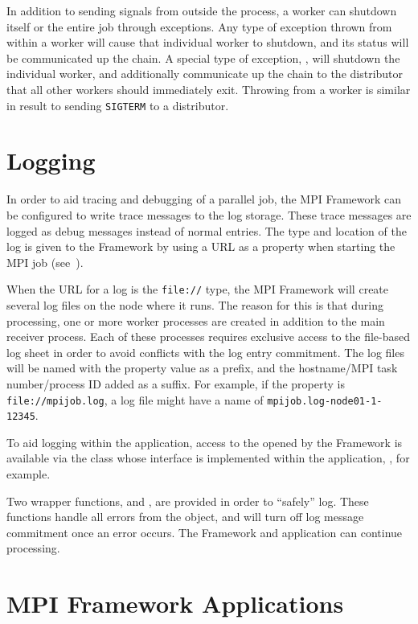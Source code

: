 In addition to sending signals from outside the process, a worker can shutdown
itself or the entire job through exceptions. Any type of exception thrown
from within a worker will cause that individual worker to shutdown, and its
status will be communicated up the chain. A special type of exception,
, will shutdown the individual worker, and additionally
communicate up the chain to the distributor that all other workers should
immediately exit. Throwing  from a worker is similar in
result to sending \texttt{SIGTERM} to a distributor.

\section{Logging}
\label{sec-mpilogging}
In order to aid tracing and debugging of a parallel job, the MPI Framework
can be configured to write trace messages to the log storage. These trace
messages are logged as debug messages instead of normal entries.
The type and location of the log is given to the 
Framework by using a URL as a property when starting the MPI
job (see~).

When the URL for a log is the {\tt file://} type, the MPI Framework will create
several log files on the node where it runs. The reason for this is that during
 processing, one or more worker processes are created in
addition to the main receiver process. Each of these processes requires
exclusive access to the file-based log sheet in order to avoid conflicts with
the log entry commitment.
The log files will be named with the property value
as a prefix, and the hostname/MPI task number/process ID added as a suffix.
For example, if the property is \verb=file://mpijob.log=, a log file might
have a name of \verb=mpijob.log-node01-1-12345=.

To aid logging within the application, access to the  opened
by the Framework is available via the class whose interface is implemented
within the application, , for example.

Two wrapper functions,  and ,
are provided in order to ``safely'' log. These functions handle all errors
from the  object, and will turn off log message commitment
once an error occurs. The Framework and application can continue processing.

\section{MPI Framework Applications}
\label{sec-mpiapp}

